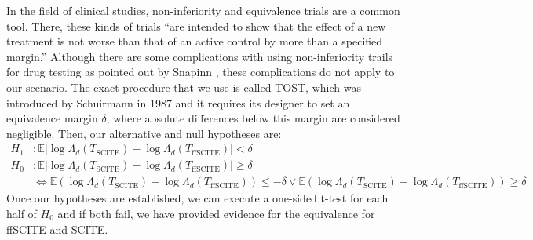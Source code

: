 In the field of clinical studies, non-inferiority and equivalence trials are a common tool. There, these kinds of trials ``are intended to show that the effect of a new treatment is not worse than that of an active control by more than a specified margin.'' \cite{snapinn2000noninferiority} Although there are some complications with using non-inferiority trails for drug testing as pointed out by Snapinn \cite{snapinn2000noninferiority}, these complications do not apply to our scenario. The exact procedure that we use is called \acf{TOST}, which was introduced by Schuirmann in 1987 \cite{schuirmann1987comparison} and it requires its designer to set an equivalence margin $\delta$, where absolute differences below this margin are considered negligible. Then, our alternative and null hypotheses are:
\begin{align*}
    H_1&: \mathbb{E} |\log\Lambda_d(T_\mathrm{SCITE}) - \log\Lambda_d(T_\mathrm{ffSCITE})| < \delta \\
    H_0&: \mathbb{E} |\log\Lambda_d(T_\mathrm{SCITE}) - \log\Lambda_d(T_\mathrm{ffSCITE})| \geq \delta \\
    &\Leftrightarrow \mathbb{E} \left(\log\Lambda_d(T_\mathrm{SCITE}) - \log\Lambda_d(T_\mathrm{ffSCITE})\right) \leq - \delta \vee \mathbb{E} \left(\log\Lambda_d(T_\mathrm{SCITE}) - \log\Lambda_d(T_\mathrm{ffSCITE})\right) \geq \delta
\end{align*}
Once our hypotheses are established, we can execute a one-sided t-test for each half of $H_0$ and if both fail, we have provided evidence for the equivalence for \ac{ffSCITE} and \ac{SCITE}.

